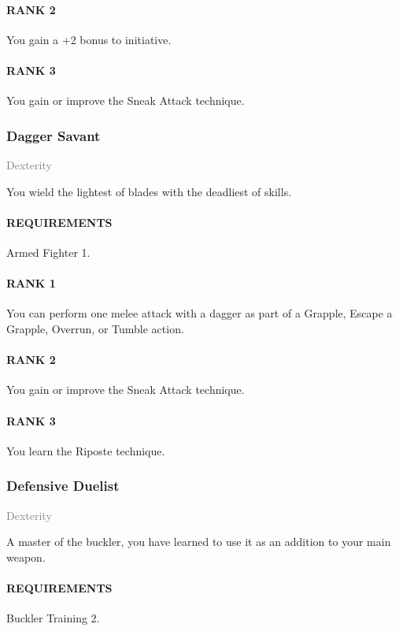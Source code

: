 \paragraph{RANK 2} You gain a +2 bonus to initiative. %
\paragraph{RANK 3} You gain or improve the Sneak Attack technique.

\subsubsection{Dagger Savant} \label{feat::daggersavant}
\small{\textcolor{gray}{Dexterity}}

\normalsize
You wield the lightest of blades with the deadliest of skills.
\paragraph{REQUIREMENTS} Armed Fighter 1.
\paragraph{RANK 1} You can perform one melee attack with a dagger as part of a Grapple, Escape a Grapple, Overrun, or Tumble action.
\paragraph{RANK 2} You gain or improve the Sneak Attack technique.
\paragraph{RANK 3} You learn the Riposte technique.

\subsubsection{Defensive Duelist} \label{feat::defensiveduelist}
\small{\textcolor{gray}{Dexterity}}

\normalsize
A master of the buckler, you have learned to use it as an addition to your main weapon.
\paragraph{REQUIREMENTS} Buckler Training 2.
